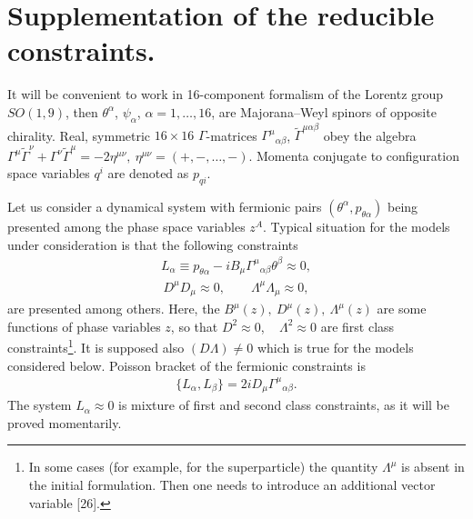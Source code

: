 \documentclass[a4paper]{article}
\begin{document}
\section{Supplementation of the reducible constraints.} 

It will be convenient to work in 16-component formalism of the Lorentz
group $SO(1, 9)$,
then $\theta^\alpha$, $\psi_\alpha$, $\alpha=1,\dots,16$, are
Majorana--Weyl spinors of opposite chirality. Real, symmetric
$16\times16$ $\Gamma$-matrices ${\Gamma^\mu}_{\alpha\beta}$,
$\tilde\Gamma^{\mu\alpha\beta}$ obey the algebra
$\Gamma^\mu\tilde\Gamma^\nu+\Gamma^\nu\tilde\Gamma^\mu=-2\eta^{\mu\nu},
~ \eta^{\mu\nu}=(+,-, \ldots ,-)$.
Momenta conjugate to configuration space variables $q^i$
are denoted as $p_{qi}$.

Let us consider a dynamical system with fermionic pairs $(\theta^\alpha,
p_{\theta\alpha})$ being presented among the phase space variables $z^A$.
Typical situation for the models under consideration is that the following
constraints
\begin{eqnarray}\label{1}
L_\alpha\equiv p_{\theta\alpha}- iB_\mu{\Gamma^\mu}_{\alpha\beta}
\theta^\beta\approx 0,
\end{eqnarray}
\begin{eqnarray}\label{3}
D^\mu D_\mu\approx0, \qquad 
\Lambda^\mu\Lambda_\mu\approx0, 
\end{eqnarray}
are presented among others.
Here, the $B^\mu(z), ~ D^\mu(z), ~ \Lambda^\mu(z)$ 
are some functions of phase variables
$z$, so that $D^2\approx0$, ~ $\Lambda^2\approx 0$ are first class 
constraints\footnote{In some 
cases (for example, for the superparticle) the quantity $\Lambda^\mu$ 
is absent in the initial formulation. Then one needs to introduce an 
additional vector variable [26].}. It is supposed also 
$(D\Lambda)\ne 0$ which is true for the models considered below. 
Poisson bracket of the fermionic constraints is
\begin{eqnarray}\label{2}
\{L_\alpha,L_\beta\}=2iD_\mu{\Gamma^\mu}_{\alpha\beta}.
\end{eqnarray}
The system $L_\alpha\approx0$ is mixture of first and second class
constraints, as it will be proved momentarily. 
\end{document}
